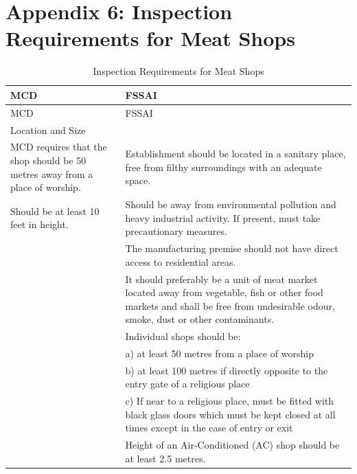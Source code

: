 \documentclass[a4paper, 12pt]{article}
\newcommand\tabitem{\makebox[1em][r]{\textbullet~}}
\begin{document}
\newpage
\section*{Appendix 6: Inspection Requirements for Meat Shops}
\begin{longtable}{>{\raggedright}p{6.5cm}>{\raggedright\arraybackslash}p{8.5cm}}
\caption{Inspection Requirements for Meat Shops} \\
\endfirsthead
\toprule
MCD & FSSAI\\
\midrule
\endhead
\midrule
MCD & FSSAI\\
\midrule
Location and Size	&	 \\
    \midrule

	\tabitem MCD requires that the shop should be 50 metres away from a place of worship.	&
	\tabitem Establishment should be located in a sanitary place, free from filthy surroundings with an adequate space.\\
	\newline{} \tabitem Should be at least 10 feet  in height.		&
	\newline{}\tabitem Should be away from environmental pollution and heavy industrial activity. If present, must take precautionary measures.	\\
		&	\newline{} \tabitem The manufacturing premise should not have direct access to residential areas.\\
	&	\newline{} \tabitem It should preferably be a unit of meat market located away from vegetable, fish or other food markets and shall be free from undesirable odour, smoke, dust or other contaminants.\\
		&	\newline{} \tabitem Individual shops should be:\\
		&	\newline{}   a) at least 50 metres from a place of worship\\
		&	\newline{}  b) at least 100 metres if directly opposite to the entry gate of a religious place\\
		&	\newline{}  c) If near to a religious place, must be fitted with black glass doors which must be kept closed at all times except in the case of entry or exit\\
		&	\newline{} \tabitem Height of an Air-Conditioned (AC) shop should be at least 2.5 metres.\\

\end{longtable}
\end{document}
